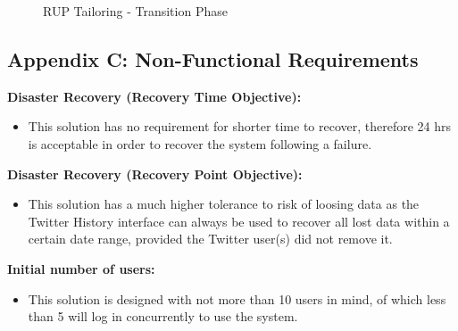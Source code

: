 \documentclass[12pt]{article} %
\begin{document}
			\begin{figure}[H] %
				\caption{RUP Tailoring - Transition Phase}
				\label{fig:speciation}
			\end{figure}
			
			\newpage
	
	\subsection{Appendix C: Non-Functional Requirements}
	
	\textbf{Disaster Recovery (Recovery Time Objective):}
	
	\begin{itemize}
		\item This solution has no requirement for shorter time to recover, therefore 24 hrs is acceptable in order to recover the system following a failure.
	\end{itemize}
	
	\textbf{Disaster Recovery (Recovery Point Objective):}
	
	\begin{itemize}
		\item This solution has a much higher tolerance to risk of loosing data as the Twitter History interface can always be used to recover all lost data within a certain date range, provided the Twitter user(s) did not remove it.
	\end{itemize}
	
	\textbf{Initial number of users:}
	
	\begin{itemize}
		\item This solution is designed with not more than 10 users in mind, of which less than 5 will log in concurrently to use the system.
	\end{itemize}
	
\end{document}
